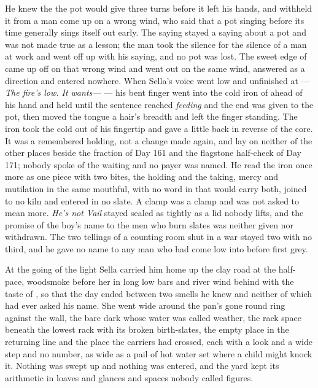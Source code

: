 He knew the  the pot would give three turns before it left his hands, and withheld it from a man come up on a wrong wind, who said that a pot singing before its time generally sings itself out early. The saying stayed a saying about a pot and was not made true as a lesson; the man took the silence for the silence of a man at work and went off up  with his saying, and no pot was lost. The sweet edge of  came up off  on that wrong wind and went out on the same wind, answered as a direction and entered nowhere. When Sella's voice went low and unfinished at  --- \emph{The fire's low. It wants---} --- his bent finger went into the cold iron of  ahead of his hand and held until the sentence reached \emph{feeding} and the end was given to the pot, then moved the tongue a hair's breadth and left the finger standing. The iron took the cold out of his fingertip and gave a little back in reverse of the core. It was a remembered holding, not a change made again, and lay on neither of the other places beside the fraction of Day 161 and the flagstone half-check of Day 171; nobody spoke of the waiting and no payer was named. He read the iron once more as one piece with two bites, the holding and the taking, mercy and mutilation in the same mouthful, with no word in  that would carry both, joined to no kiln and entered in no slate. A clamp was a clamp and was not asked to mean more. \emph{He's not Vail} stayed sealed as tightly as a lid nobody lifts, and the promise of the boy's name to the men who burn slates was neither given nor withdrawn. The two tellings of a counting room shut in a war stayed two with no third, and he gave no name to any man who had come low into  before first grey.

\scenebreak

At the going of the light Sella carried him home up the clay road at the half-pace, woodsmoke before her in long low bars and river wind behind with the taste of , so that the day ended between two smells he knew and neither of which had ever asked his name. She went wide around the pan's gone round ring against the wall, the bare dark  whose water was called weather, the rack space beneath the lowest rack with its broken birth-slates, the empty place in the returning line and the place the carriers had crossed, each with a look and a wide step and no number, as wide as a pail of hot water set where a child might knock it. Nothing was swept up and nothing was entered, and the yard kept its arithmetic in loaves and glances and spaces nobody called figures.

